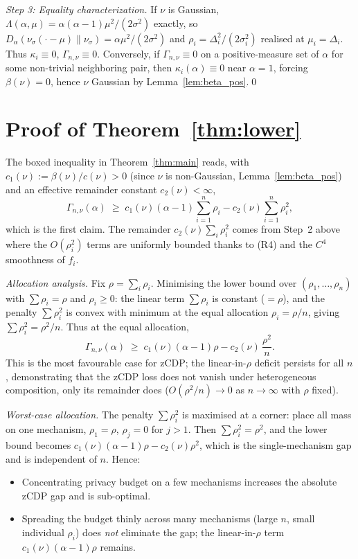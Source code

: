 \documentclass[11pt]{article}
\theoremstyle{definition}
\begin{document}
\smallskip
\noindent\emph{Step 3: Equality characterization.} If $\nu$ is Gaussian, $\Lambda(\alpha,\mu)=\alpha(\alpha-1)\mu^2/(2\sigma^2)$ exactly, so $D_\alpha(\nu_\sigma(\cdot-\mu)\|\nu_\sigma)=\alpha\mu^2/(2\sigma^2)$ and $\rho_i=\Delta_i^2/(2\sigma_i^2)$ realised at $\mu_i=\Delta_i$. Thus $\kappa_i\equiv 0$, $\Gamma_{n,\nu}\equiv 0$. Conversely, if $\Gamma_{n,\nu}\equiv 0$ on a positive-measure set of $\alpha$ for some non-trivial neighboring pair, then $\kappa_i(\alpha)\equiv 0$ near $\alpha=1$, forcing $\beta(\nu)=0$, hence $\nu$ Gaussian by Lemma~\ref{lem:beta_pos}.\qed

\section{Proof of Theorem~\ref{thm:lower}}

The boxed inequality in Theorem~\ref{thm:main} reads, with $c_1(\nu):=\beta(\nu)/c(\nu)>0$ (since $\nu$ is non-Gaussian, Lemma~\ref{lem:beta_pos}) and an effective remainder constant $c_2(\nu)<\infty$,
\[
\Gamma_{n,\nu}(\alpha)\;\ge\;c_1(\nu)(\alpha-1)\sum_{i=1}^n\rho_i-c_2(\nu)\sum_{i=1}^n\rho_i^2,
\]
which is the first claim. The remainder $c_2(\nu)\sum_i\rho_i^2$ comes from Step~2 above where the $O(\rho_i^2)$ terms are uniformly bounded thanks to (R4) and the $C^4$ smoothness of $f_i$.

\smallskip
\noindent\emph{Allocation analysis.} Fix $\rho=\sum_i\rho_i$. Minimising the lower bound over $(\rho_1,\dots,\rho_n)$ with $\sum\rho_i=\rho$ and $\rho_i\ge 0$: the linear term $\sum\rho_i$ is constant ($=\rho$), and the penalty $\sum\rho_i^2$ is convex with minimum at the equal allocation $\rho_i=\rho/n$, giving $\sum\rho_i^2=\rho^2/n$. Thus at the equal allocation,
\[
\Gamma_{n,\nu}(\alpha)\;\ge\;c_1(\nu)(\alpha-1)\rho-c_2(\nu)\,\frac{\rho^2}{n}.
\]
This is the most favourable case for zCDP; the linear-in-$\rho$ deficit persists for all $n$, demonstrating that the zCDP loss does not vanish under heterogeneous composition, only its remainder does ($O(\rho^2/n)\to 0$ as $n\to\infty$ with $\rho$ fixed).

\smallskip
\noindent\emph{Worst-case allocation.} The penalty $\sum\rho_i^2$ is maximised at a corner: place all mass on one mechanism, $\rho_1=\rho$, $\rho_j=0$ for $j>1$. Then $\sum\rho_i^2=\rho^2$, and the lower bound becomes $c_1(\nu)(\alpha-1)\rho-c_2(\nu)\rho^2$, which is the single-mechanism gap and is independent of $n$. Hence:
\begin{itemize}[leftmargin=*]
\item Concentrating privacy budget on a few mechanisms increases the absolute zCDP gap and is sub-optimal.
\item Spreading the budget thinly across many mechanisms (large $n$, small individual $\rho_i$) does \emph{not} eliminate the gap; the linear-in-$\rho$ term $c_1(\nu)(\alpha-1)\rho$ remains.
\end{itemize}
\end{document}
